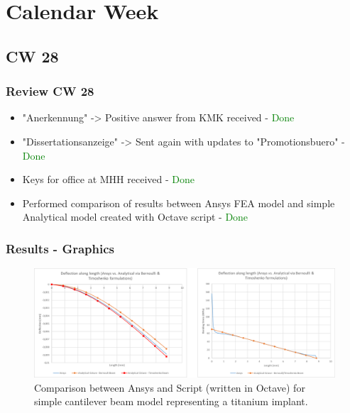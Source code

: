 \section{Calendar Week}
\subsection{CW 28}
\begin{frame}
  \frametitle{Review CW 28}
	\begin{itemize}
		\item "Anerkennung" -> Positive answer from KMK received - \textcolor{green}{Done} 
		\item "Dissertationsanzeige" -> Sent again with updates to "Promotionsbuero" - \textcolor{green}{Done} 
		\item Keys for office at MHH received - \textcolor{green}{Done}
		\item Performed comparison of results between Ansys FEA model and simple Analytical model created with Octave script - \textcolor{green}{Done} 
	\end{itemize}
\end{frame}

\begin{frame}
	\frametitle{Results - Graphics}
	\begin{figure}
	\includegraphics[width=1.0\textwidth]{pictures/CW28_1}
	\caption{Comparison between Ansys and Script (written in Octave) for simple cantilever beam model representing a titanium implant.}
	\end{figure}
\end{frame}

